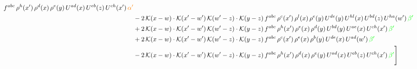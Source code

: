 \documentclass[9pt]{article}
\numberwithin{equation}{section}
\begin{document}
\begin{align}
f^{abc}\,\rho^{h}(x')\,\rho^{d}(x)\,\rho^{e}(y)\,U^{ad}(x)\,U^{eb}(z)\,U^{ch}(x')\,{\color{orange} \alpha'}\notag\\ & -2\,\mathcal{K}(x-w)\cdot\mathcal{K}(x'-w')\,\mathcal{K}(w'-z)\cdot\mathcal{K}(y-z)\, f^{abc}\,\rho^{c}(x')\,\rho^{l}(x)\,\rho^{e}(y)\,U^{de}(y)\,U^{hl}(x)\,U^{bd}(z)\,U^{ha}(w')\,{\color{green} \beta'}\notag\\ &+2\,\mathcal{K}(x-w)\cdot\mathcal{K}(x'-w')\,\mathcal{K}(w'-z)\cdot\mathcal{K}(y-z)\, f^{abc}\,\rho^{h}(x')\,\rho^{e}(x)\,\rho^{d}(y)\,U^{bd}(y)\,U^{ae}(x)\,U^{ch}(x')\,{\color{green} \beta'}\notag\\ &+2\,\mathcal{K}(x-w)\cdot\mathcal{K}(x'-w')\,\mathcal{K}(w'-z)\cdot\mathcal{K}(y-z)\, f^{abc}\,\rho^{c}(x')\,\rho^{e}(x)\,\rho^{b}(y)\,U^{de}(x)\,U^{ad}(w')\,{\color{green} \beta'}\notag\\ & -2\,\mathcal{K}(x-w)\cdot\mathcal{K}(x'-w')\,\mathcal{K}(w'-z)\cdot\mathcal{K}(y-z)\, f^{abc}\,\rho^{h}(x')\,\rho^{d}(x)\,\rho^{e}(y)\,U^{ad}(x)\,U^{eb}(z)\,U^{ch}(x')\,{\color{green} \beta'}\Bigg] 
\end{align}     
\end{document}
